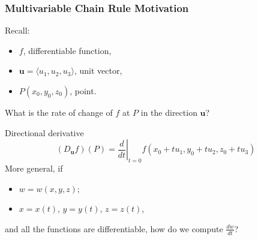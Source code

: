 \begin{frame}
  \frametitle{Multivariable Chain Rule Motivation}

Recall:
\begin{itemize}
  \item $f$, differentiable function,
  \item $\textbf{u}=\langle u_1,u_2,u_3 \rangle$, unit vector,
  \item $P(x_0,y_0,z_0)$, point.
\end{itemize}
%
What is the rate of change of $f$ at $P$ in the direction $\textbf{u}$?

\pause
Directional derivative
%
$$(D_{\textbf{u}}f)(P) = \left. \frac{d}{dt}\right|_{t=0} f(x_0+tu_1, y_0+tu_2,z_0+tu_3)$$
%
\pause
More general, if
\begin{itemize}
\item $w=w(x,y,z)$;
\item $x=x(t)$, $y=y(t)$, $z=z(t)$,
\end{itemize}
%
and all the functions are differentiable, how do we compute $\frac{dw}{dt}$?
\end{frame}